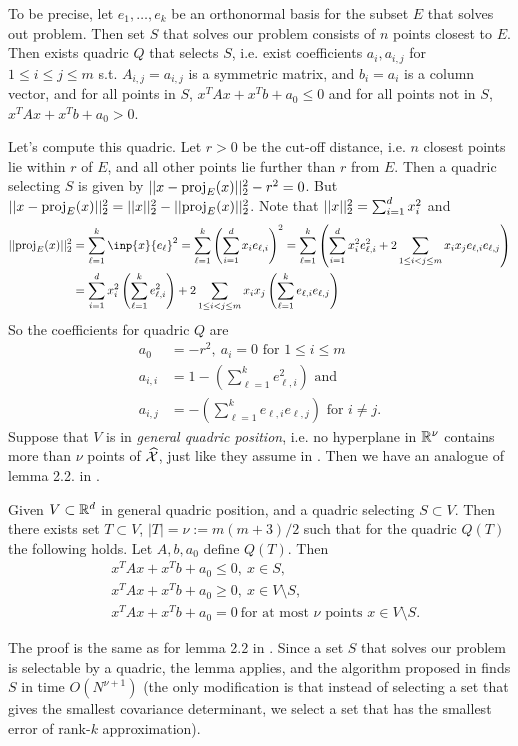 \documentclass{article}
\begin{document}
To be precise, let $e_1,\dots,e_k$ be an orthonormal basis for the subset $E$ that solves out problem. Then set $S$ that solves our problem consists of $n$ points closest to $E$. Then exists quadric $Q$ that selects $S$, i.e. exist coefficients $a_i, a_{i,j}$ for $1\leq i\leq j\leq m$ s.t. $A_{i,j} = a_{i,j}$ is a symmetric matrix, and $b_i = a_i$ is a column vector, and for all points in $S$, $x^TAx + x^Tb + a_0 \leq 0$ and for all points not in $S$, $x^TAx + x^Tb + a_0 > 0$.

Let's compute this quadric. Let $r>0$ be the cut-off distance, i.e. $n$ closest points lie within $r$ of $E$, and all other points lie further than $r$ from $E$. Then a quadric selecting $S$ is given by $||x - \text{proj}_{E}(x)||_2^2 - r^2 = 0$. But $||x - \text{proj}_{E}(x)||_2^2 = ||x||_2^2 - ||\text{proj}_{E}(x)||_2^2$. Note that $||x||_2^2 = \sum_{i=1}^d x_i^2$ and
\begin{align*}
    \norm{\proj_{E}(x)}_2^2 &= \sum_{\ell=1}^k \inp{x}{e_\ell}^2 = \sum_{\ell=1}^k \left(\sum_{i=1}^d x_i e_{\ell,i}\right)^2 = \sum_{\ell=1}^k \left( \sum_{i=1}^d x_i^2 e_{\ell,i}^2 + 2\sum_{1\leq i < j\leq m} x_ix_j e_{\ell,i}e_{\ell,j} \right)\\
    &= \sum_{i=1}^d x_i^2 \left(\sum_{\ell=1}^k  e_{\ell,i}^2\right) + 2\sum_{1\leq i < j\leq m} x_ix_j \left(\sum_{\ell=1}^k  e_{\ell,i}e_{\ell,j} \right)
\end{align*}
So the coefficients for quadric $Q$ are
\begin{align*}
    a_0 &= -r^2,\ a_i = 0 \text{ for $1\leq i\leq m$}\\
    a_{i,i} &= 1 - \left(\sum_{\ell=1}^k  e_{\ell,i}^2 \right) \text{ and } \\
    a_{i,j} &= - \left(\sum_{\ell=1}^k  e_{\ell,i}e_{\ell,j} \right)\text{ for $i\neq j$}.
\end{align*}
Suppose that $V$ is in \textit{general quadric position}, i.e. no hyperplane in $\mathbb{R}^\nu$ contains more than $\nu$ points of $\widehat{\mathcal{X}}$, just like they assume in \cite{bernholt2004complexity}. Then we have an analogue of lemma 2.2. in \cite{bernholt2004complexity}.
\begin{lemma}
Given $V\subset \mathbb{R}^d$ in general quadric position, and a quadric selecting $S\subset V$. Then there exists set $T \subset V$, $|T| = \nu := m(m+3)/2$ such that for the quadric $Q(T)$ the following holds. Let $A,b,a_0$ define $Q(T)$. Then
\begin{align*}
    & x^TAx + x^Tb + a_0 \leq 0,\ x\in S,\\
    & x^TAx + x^Tb + a_0 \geq 0,\ x\in V\setminus S,\\
    & x^TAx + x^Tb + a_0 = 0\ \text{for at most $\nu$ points $x\in V\setminus S$}.
\end{align*}
\end{lemma}
The proof is the same as for lemma 2.2 in \cite{bernholt2004complexity}. Since a set $S$ that solves our problem is selectable by a quadric, the lemma applies, and the algorithm proposed in \cite{bernholt2004complexity} finds $S$ in time $O(N^{\nu+1})$ (the only modification is that instead of selecting a set that gives the smallest covariance determinant, we select a set that has the smallest error of rank-$k$ approximation).
\end{document}
